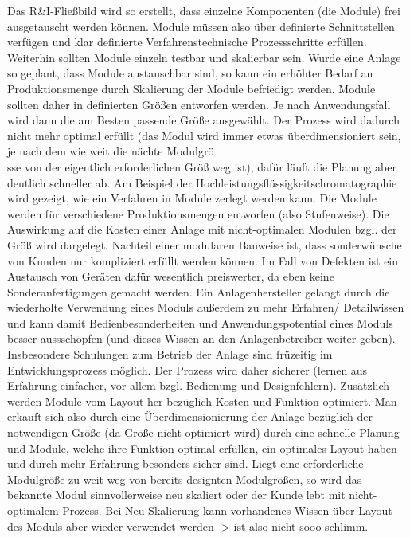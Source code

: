 Das R{\&}I-Flie{\ss}bild wird so erstellt, dass einzelne Komponenten (die Module) frei ausgetauscht werden k\"onnen. Module m\"ussen also \"uber definierte Schnittstellen verf\"ugen und klar definierte Verfahrenstechnische Prozessschritte erf\"ullen. Weiterhin sollten Module einzeln testbar und skalierbar sein. Wurde eine Anlage so geplant, dass Module austauschbar sind, so kann ein erh\"ohter Bedarf an Produktionsmenge durch Skalierung der Module befriedigt werden. Module sollten daher in definierten Gr\"o\ss{}en entworfen werden. Je nach Anwendungsfall wird dann die am Besten passende Gr\"o\ss{}e ausgew\"ahlt. Der Prozess wird dadurch nicht mehr optimal erf\"ullt (das Modul wird immer etwas \"uberdimensioniert sein, je nach dem wie weit die n\"achte Modulgr\"o\\ss{}e von der eigentlich erforderlichen Gr\"o\ss{} weg ist), daf\"ur l\"auft die Planung aber deutlich schneller ab. Am Beispiel der Hochleistungsfl\"ussigkeitschromatographie wird gezeigt, wie ein Verfahren in Module zerlegt werden kann. Die Module werden f\"ur verschiedene Produktionsmengen entworfen (also Stufenweise). Die Auswirkung auf die Kosten einer Anlage mit nicht-optimalen Modulen bzgl. der Gr\"o\ss{} wird dargelegt. Nachteil einer modularen Bauweise ist, dass sonderw\"unsche von Kunden nur kompliziert erf\"ullt werden k\"onnen. Im Fall von Defekten ist ein Austausch von Ger\"aten daf\"ur wesentlich preiswerter, da eben keine Sonderanfertigungen gemacht werden. Ein Anlagenhersteller gelangt durch die wiederholte Verwendung eines Moduls au\ss{}erdem zu mehr Erfahren/ Detailwissen und kann damit Bedienbesonderheiten und Anwendungspotential eines Moduls besser ausssch\"opfen (und dieses Wissen an den Anlagenbetreiber weiter geben). Insbesondere Schulungen zum Betrieb der Anlage sind fr\"uzeitig im Entwicklungsprozess m\"oglich. Der Prozess wird daher sicherer (lernen aus Erfahrung einfacher, vor allem bzgl. Bedienung und Designfehlern). Zus\"atzlich werden Module vom Layout her bez\"uglich Kosten und Funktion optimiert. Man erkauft sich also durch eine \"Uberdimensionierung der Anlage bez\"uglich der notwendigen Gr\"o\ss{}e (da Gr\"o\ss{}e nicht optimiert wird) durch eine schnelle Planung und Module, welche ihre Funktion optimal erf\"ullen, ein optimales Layout haben und durch mehr Erfahrung besonders sicher sind. Liegt eine erforderliche Modulgr\"o\ss{}e zu weit weg von bereits designten Modulgr\"o\ss{}en, so wird das bekannte Modul sinnvollerweise neu skaliert oder der Kunde lebt mit nicht-optimalem Prozess. Bei Neu-Skalierung kann vorhandenes Wissen \"uber Layout des Moduls aber wieder verwendet werden -> ist also nicht sooo schlimm. 

